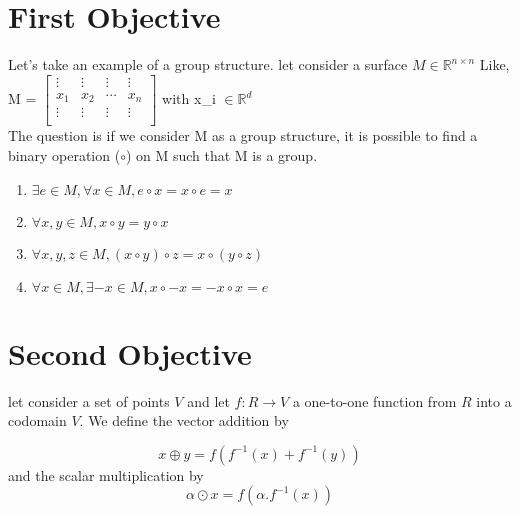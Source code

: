 \documentclass{article}
\begin{document}
\section{First Objective}
Let's take an example of a group structure.
    let consider a surface $M \in \mathbb{R}^{n \times n}$
    Like, 
    M = 
    $\begin{bmatrix}
        \vdots & \vdots & \vdots &\vdots \\
        x_{1} & x_{2} & \cdots & x_{n} \\
        \vdots & \vdots & \vdots &\vdots \\
    \end{bmatrix}$
    with x_{i} $\in \mathbb{R}^{d}$ \\
    The question is if we consider M as a group structure, it is possible to find a binary operation ($\circ$) on M such that M is a group.
    \begin{enumerate}
        \item $\exists e \in M, \forall x \in M, e \circ x = x \circ e = x$
        \item $\forall{} x,y \in{} M, x \circ y = y \circ x$
        \item $\forall x,y,z \in M, (x \circ y) \circ z = x \circ (y \circ z)$
        \item $\forall x \in M, \exists -x \in M, x \circ -x = -x \circ x = e$
    \end{enumerate}


\section{Second Objective}
	let consider a set of points  $ V $ and let  $ f: R \rightarrow V $ a one-to-one
	function from $R$ into a codomain $V$. We define the vector addition by
	
     $$ x \oplus y = f(f^{-1}(x) + f^{-1}(y)) $$
     and the scalar multiplication by
     $$ \alpha \odot x = f(  \alpha.f^{-1}(x)) $$
		
\end{document}
